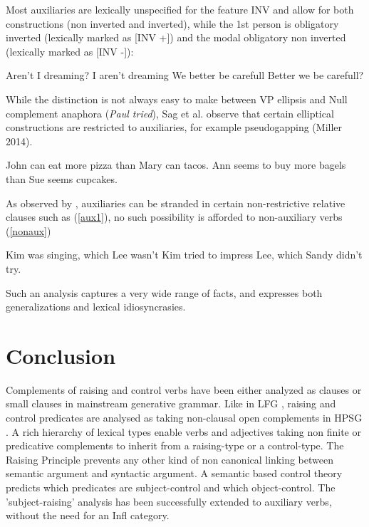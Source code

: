 \documentclass[output=paper]{langsci/langscibook}
\begin{document}
Most auxiliaries are lexically unspecified for the feature INV and allow for both constructions (non inverted and inverted), while the 1st person  is obligatory inverted (lexically marked as [INV +]) and the modal  obligatory non inverted (lexically marked as [INV -]):

\begin{exe}
\ex \begin{xlist}
\ex Aren't I dreaming?
\ex *I aren't dreaming
\ex We better be carefull
\ex *Better we be carefull?
\end{xlist}
\end{exe}

While the distinction is not always easy to make between VP ellipsis and Null complement anaphora (\textit{Paul tried}), Sag et al. observe that certain elliptical constructions are restricted to auxiliaries, for example pseudogapping (Miller 2014).

\begin{exe}
\ex \begin{xlist}
\ex John can eat more pizza than Mary can tacos.
\ex *Ann seems to buy more bagels than Sue seems cupcakes.
\end{xlist}
\end{exe}

As observed by \citet{ArnoldandBorsley2008}, auxiliaries can be stranded in certain non-restrictive relative clauses such as (\ref{aux1}), no such possibility is afforded to non-auxiliary verbs (\ref{nonaux})

\begin{exe}
\ex \begin{xlist}
\ex Kim was singing, which Lee wasn't \label{aux1}
\ex *Kim tried to impress Lee, which Sandy didn’t try. \label{nonaux}
\end{xlist}
\end{exe}

Such an analysis captures a very wide range of facts, and expresses both generalizations and lexical idiosyncrasies.


	
\section{Conclusion}
Complements of raising and control verbs have been either analyzed as clauses \citep{Chomsky1981} or small clauses \citep{Stowell1981,Stowell1983} in mainstream generative grammar.
Like in LFG \citet{Bresnan1982}, raising and control predicates are analysed as taking non-clausal open complements in HPSG \citet{PollardandSag1994}. A rich hierarchy of lexical types enable verbs and adjectives taking non finite or predicative complements to inherit from a raising-type or a control-type. The Raising Principle prevents any other kind of non canonical linking between semantic argument and syntactic argument. A semantic based control theory predicts which predicates are subject-control and which object-control. The 'subject-raising' analysis has been successfully extended to auxiliary verbs, without the need for an Infl category.
\end{document}
